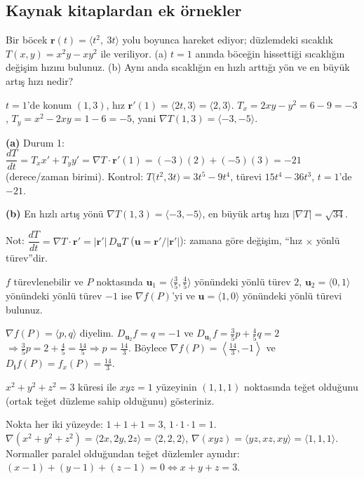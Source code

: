 \subsection{Kaynak kitaplardan ek örnekler}

\begin{soru}
Bir böcek $\mathbf r(t)=\langle t^2,\ 3t\rangle$ yolu boyunca hareket ediyor; düzlemdeki sıcaklık $T(x,y)=x^2y-xy^2$ ile
veriliyor. (a) $t=1$ anında böceğin hissettiği sıcaklığın değişim hızını bulunuz. (b) Aynı anda sıcaklığın en hızlı
arttığı yön ve en büyük artış hızı nedir?
\end{soru}
\begin{cevap}
$t=1$'de konum $(1,3)$, hız $\mathbf r'(1)=\langle2t,3\rangle=\langle2,3\rangle$.
$T_x=2xy-y^2=6-9=-3$, $T_y=x^2-2xy=1-6=-5$, yani $\nabla T(1,3)=\langle-3,-5\rangle$.

\textbf{(a)} Durum 1: $\dfrac{dT}{dt}=T_x x'+T_y y'=\nabla T\cdot\mathbf r'(1)=(-3)(2)+(-5)(3)=\boxed{-21}$ (derece/zaman birimi).
Kontrol: $T\big(t^2,3t\big)=3t^5-9t^4$, türevi $15t^4-36t^3$, $t=1$'de $-21$. \checkmark

\textbf{(b)} En hızlı artış yönü $\nabla T(1,3)=\langle-3,-5\rangle$, en büyük artış hızı $|\nabla T|=\sqrt{34}$.

Not: $\dfrac{dT}{dt}=\nabla T\cdot\mathbf r'=|\mathbf r'|\,D_{\mathbf u}T$ ($\mathbf u=\mathbf r'/|\mathbf r'|$): zamana göre
değişim, ``hız $\times$ yönlü türev''dir.
\end{cevap}

\begin{soru}
$f$ türevlenebilir ve $P$ noktasında $\mathbf u_1=\langle\frac35,\frac45\rangle$ yönündeki yönlü türev $2$,
$\mathbf u_2=\langle0,1\rangle$ yönündeki yönlü türev $-1$ ise $\nabla f(P)$'yi ve $\mathbf u=\langle1,0\rangle$
yönündeki yönlü türevi bulunuz.
\end{soru}
\begin{cevap}
$\nabla f(P)=\langle p,q\rangle$ diyelim. $D_{\mathbf u_2}f=q=-1$ ve $D_{\mathbf u_1}f=\frac35p+\frac45q=2$
$\Rightarrow\frac35p=2+\frac45=\frac{14}{5}\Rightarrow p=\frac{14}{3}$. Böylece $\nabla f(P)=\left\langle\frac{14}{3},-1\right\rangle$
ve $D_{\mathbf i}f(P)=f_x(P)=\frac{14}{3}$.
\end{cevap}

\begin{soru}
$x^2+y^2+z^2=3$ küresi ile $xyz=1$ yüzeyinin $(1,1,1)$ noktasında teğet olduğunu (ortak teğet düzleme sahip
olduğunu) gösteriniz.
\end{soru}
\begin{cevap}
Nokta her iki yüzeyde: $1+1+1=3$, $1\cdot1\cdot1=1$. $\nabla(x^2+y^2+z^2)=\langle2x,2y,2z\rangle=\langle2,2,2\rangle$,
$\nabla(xyz)=\langle yz,xz,xy\rangle=\langle1,1,1\rangle$. Normaller paralel olduğundan teğet düzlemler aynıdır:
$(x-1)+(y-1)+(z-1)=0\iff x+y+z=3$.
\end{cevap}

